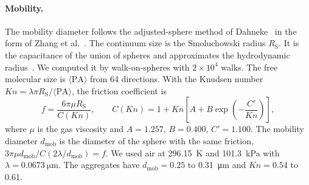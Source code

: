 \documentclass[11pt,a4paper]{article}
\begin{document}
\paragraph{Mobility.}
The mobility diameter follows the adjusted-sphere method of Dahneke~\cite{dahneke1973a,dahneke1973c} in the form of Zhang et al.~\cite{zhang2012}.
The continuum size is the Smoluchowski radius $R_\text{S}$.
It is the capacitance of the union of spheres and approximates the hydrodynamic radius~\cite{hubbard1993}.
We computed it by walk-on-spheres with $2 \times 10^4$ walks.
The free molecular size is $\langle\text{PA}\rangle$ from 64 directions.
With the Knudsen number $\mathit{Kn} = \lambda \pi R_\text{S} / \langle\text{PA}\rangle$, the friction coefficient is
\begin{equation}
  f = \frac{6\pi\mu R_\text{S}}{C(\mathit{Kn})} , \qquad
  C(\mathit{Kn}) = 1 + \mathit{Kn}\left[A + B \exp\left(-\frac{C'}{\mathit{Kn}}\right)\right] ,
  \label{eq:adjusted-sphere}
\end{equation}
where $\mu$ is the gas viscosity and $A = 1.257$, $B = 0.400$, $C' = 1.100$.
The mobility diameter $d_\text{mob}$ is the diameter of the sphere with the same friction, $3\pi\mu d_\text{mob} / C(2\lambda/d_\text{mob}) = f$.
We used air at \SI{296.15}{\kelvin} and \SI{101.3}{\kilo\pascal} with $\lambda = \SI{0.0673}{\micro\meter}$.
The aggregates have $d_\text{mob} = 0.25$ to \SI{0.31}{\micro\meter} and $\mathit{Kn} = 0.54$ to 0.61.
\end{document}
